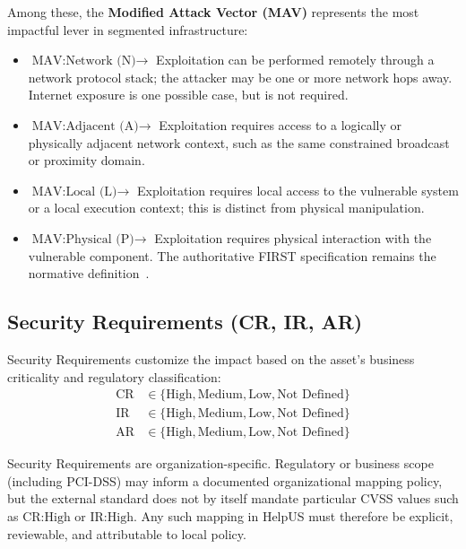 Among these, the \textbf{Modified Attack Vector (MAV)} represents the most impactful lever in segmented infrastructure:
\begin{itemize}
    \item $\text{MAV:Network (N)} \rightarrow$ Exploitation can be performed remotely through a network protocol stack; the attacker may be one or more network hops away. Internet exposure is one possible case, but is not required.
    \item $\text{MAV:Adjacent (A)} \rightarrow$ Exploitation requires access to a logically or physically adjacent network context, such as the same constrained broadcast or proximity domain.
    \item $\text{MAV:Local (L)} \rightarrow$ Exploitation requires local access to the vulnerable system or a local execution context; this is distinct from physical manipulation.
    \item $\text{MAV:Physical (P)} \rightarrow$ Exploitation requires physical interaction with the vulnerable component. The authoritative FIRST specification remains the normative definition~\cite{first_cvss_v4}.
\end{itemize}

\subsection{Security Requirements (CR, IR, AR)}
Security Requirements customize the impact based on the asset's business criticality and regulatory classification:
\begin{align}
    \text{CR} &\in \{\text{High}, \text{Medium}, \text{Low}, \text{Not Defined}\} \\
    \text{IR} &\in \{\text{High}, \text{Medium}, \text{Low}, \text{Not Defined}\} \\
    \text{AR} &\in \{\text{High}, \text{Medium}, \text{Low}, \text{Not Defined}\}
\end{align}

Security Requirements are organization-specific. Regulatory or business scope (including PCI-DSS) may inform a documented organizational mapping policy, but the external standard does not by itself mandate particular CVSS values such as $\text{CR:High}$ or $\text{IR:High}$. Any such mapping in HelpUS must therefore be explicit, reviewable, and attributable to local policy.

